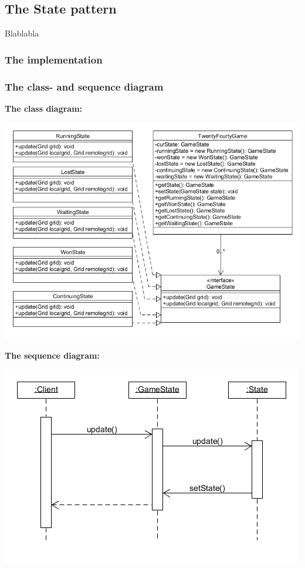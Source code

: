 \documentclass[a4paper,11pt,report]{scrartcl}
\begin{document}
\newpage\subsection{The State pattern}
Blablabla

\subsubsection{The implementation}

\newpage\subsubsection{The class- and sequence diagram}
\textbf{The class diagram:}\\
\centerline{\includegraphics[scale=0.7]{statePatternUML}}

\newpage\textbf{The sequence diagram:}\\
\centerline{\includegraphics[scale=1]{statePatternSequence}}
\end{document}
